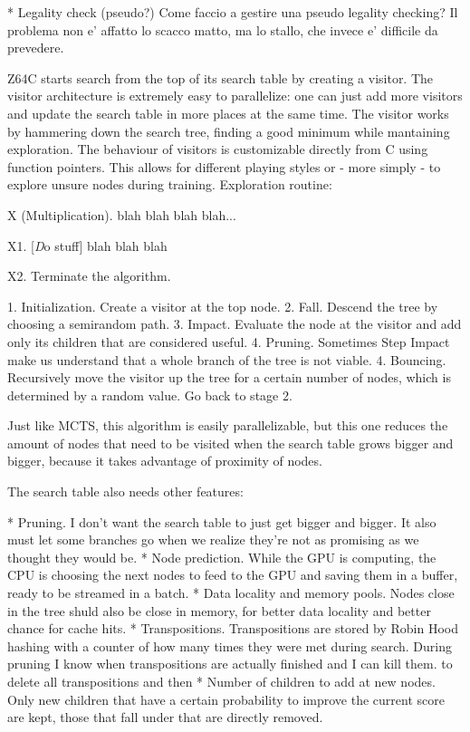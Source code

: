 * Legality check (pseudo?)
  Come faccio a gestire una pseudo legality checking? Il problema non e' affatto
  lo scacco matto, ma lo stallo, che invece e' difficile da prevedere.


Z64C starts search from the top of its search table by creating a visitor. The
visitor architecture is extremely easy to parallelize: one can just add more
visitors and update the search table in more places at the same time. The
visitor works by hammering down the search tree, finding a good minimum while
mantaining exploration. The behaviour of visitors is customizable directly from
C using function pointers. This allows for different playing styles or - more
simply - to explore unsure nodes during training. Exploration routine:


\algbegin X (Multiplication). blah blah blah blah...

\algstep X1. [{\textit Do stuff\/}] blah blah blah

\algstep X2. Terminate the algorithm.\quad\slug

1. Initialization. Create a visitor at the top node.
2. Fall. Descend the tree by choosing a semirandom path.
3. Impact. Evaluate the node at the visitor and add only its children that are
   considered useful.
4. Pruning. Sometimes Step Impact make us understand that a whole branch of the
   tree is not viable.
4. Bouncing. Recursively move the visitor up the tree for a certain number of
   nodes, which is determined by a random value. Go back to stage 2.

Just like MCTS, this algorithm is easily parallelizable, but this one reduces
the amount of nodes that need to be visited when the search table grows bigger
and bigger, because it takes advantage of proximity of nodes.

The search table also needs other features:

* Pruning. I don't want the search table to just get bigger and bigger. It also
  must let some branches go when we realize they're not as promising as we
  thought they would be.
* Node prediction. While the GPU is computing, the CPU is choosing the next
  nodes to feed to the GPU and saving them in a buffer, ready to be streamed in
  a batch.
* Data locality and memory pools. Nodes close in the tree shuld also be close in
  memory, for better data locality and better chance for cache hits.
* Transpositions. Transpositions are stored by Robin Hood hashing with
  a counter of how many times they were met during search. During pruning I know
  when transpositions are actually finished and I can kill them.
  to delete all transpositions
  and then
* Number of children to add at new nodes. Only new children that have a certain
  probability to improve the current score are kept, those that fall under that
  are directly removed.

